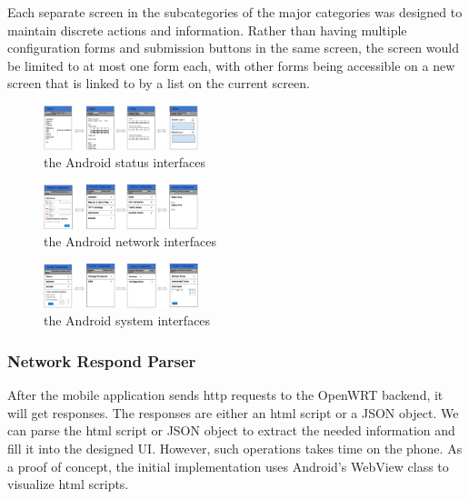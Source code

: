 Each separate screen in the subcategories of the major categories was designed to maintain discrete actions and information. Rather than having multiple configuration forms and submission buttons in the same screen, the screen would be limited to at most one form each, with other forms being accessible on a new screen that is linked to by a list on the current screen.

	\begin{figure}
		\centering
		\includegraphics[width=0.4\textwidth]{UIstatus.png}
		\caption{the Android status interfaces}
		\label{OpenWRT:androidstatus}
	\end{figure}
	
	\begin{figure}
		\centering
		\includegraphics[width=0.4\textwidth]{UInetwork.png}
		\caption{the Android network interfaces}
		\label{OpenWRT:androidnetwork}
	\end{figure}
	\begin{figure}
		\centering
		\includegraphics[width=0.4\textwidth]{UIsystem.png}
		\caption{the Android system interfaces}
		\label{OpenWRT:androidsystem}
	\end{figure}

\subsubsection{Network Respond Parser}

After the mobile application sends http requests to the OpenWRT backend, it will get responses. The responses are either an html script or a JSON object. We can parse the html script or JSON object to extract the needed information and fill it into the designed UI. However, such operations takes time on the phone. As a proof of concept, the initial implementation uses Android's WebView class to visualize html scripts.

